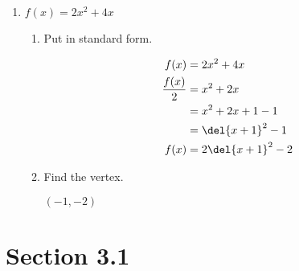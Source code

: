 \documentclass{exam}
\begin{document}
\begin{enumerate}
\begin{enumerate}[a]
      \end{enumerate}

    \item $f(x) = 2x^2 + 4x$ 
      \begin{enumerate}[a]
        \item Put in standard form.
          \begin{solution}
            \begin{align*}
              f(x)           &= 2x^2 + 4x \\
              \frac{f(x)}{2} &= x^2 + 2x \\
                             &= x^2 + 2x + 1 - 1 \\
                             &= \del{x + 1}^2 - 1 \\
              f(x)           &= 2\del{x + 1}^2 - 2 \\
            \end{align*}
          \end{solution}
        \item Find the vertex.
          \begin{solution}
            $ (-1, -2) $
          \end{solution}

      \end{enumerate}

  \end{enumerate}

  \pagebreak

  \section{Section 3.1}
\end{document}

